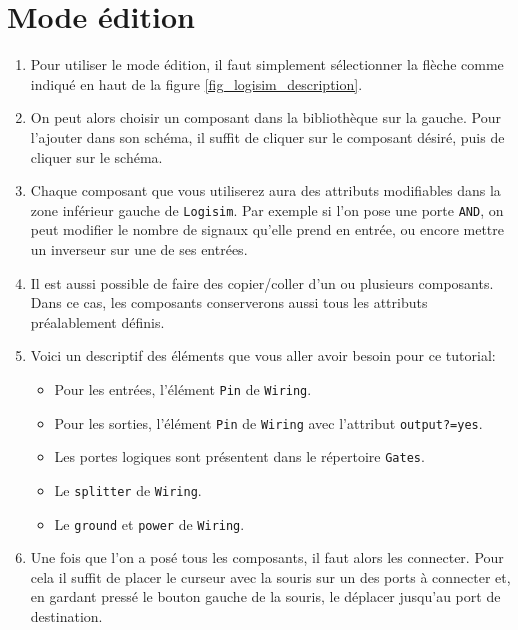 \documentclass[nosolution]{exercice}
\begin{document}
\section{Mode édition}
\begin{enumerate}
\item Pour utiliser le mode édition, il faut simplement sélectionner la flèche comme indiqué en haut de la figure
\ref{fig_logisim_description}.
\item On peut alors choisir un composant dans la bibliothèque sur la gauche. Pour l'ajouter dans son schéma, il suffit
de cliquer sur le composant désiré, puis de cliquer sur le schéma.

\item Chaque composant que vous utiliserez aura des attributs modifiables dans la zone inférieur gauche de
\texttt{Logisim}. Par exemple si l'on pose une porte \texttt{AND}, on peut modifier le nombre de signaux qu'elle prend en
entrée, ou encore mettre un inverseur sur une de ses entrées.

\item Il est aussi possible de faire des copier/coller d'un ou plusieurs composants. Dans ce cas, les composants
conserverons aussi tous les attributs préalablement définis.

\item Voici un descriptif des éléments que vous aller avoir besoin pour ce tutorial:
\begin{itemize}
\item Pour les entrées, l'élément \texttt{Pin} de \texttt{Wiring}.
\item Pour les sorties, l'élément \texttt{Pin} de \texttt{Wiring} avec l'attribut \texttt{output?=yes}.
\item Les portes logiques sont présentent dans le répertoire \texttt{Gates}.
\item Le \texttt{splitter} de \texttt{Wiring}.
\item Le \texttt{ground} et \texttt{power} de \texttt{Wiring}.
\end{itemize}

\item Une fois que l'on a posé tous les composants, il faut alors les connecter. Pour cela il suffit de placer le curseur
avec la souris sur un des ports à connecter et, en gardant pressé le bouton
gauche de la souris, le déplacer jusqu'au port de destination.

\end{enumerate}

\end{document}

